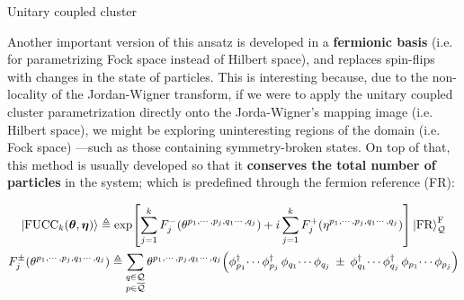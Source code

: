 \documentclass[9pt, handout, aspectratio=169]{beamer}	%
\begin{document}
\begin{frame}[allowframebreaks]{Unitary coupled cluster}
\break

	Another important version of this ansatz is developed in a \textbf{fermionic basis} (i.e. for parametrizing Fock space instead of Hilbert space), and replaces spin-flips with changes in the state of particles. This is interesting because, due to the non-locality of the Jordan-Wigner transform, if we were to apply the unitary coupled cluster parametrization directly onto the Jorda-Wigner's mapping image (i.e. Hilbert space), we might be exploring uninteresting regions of the domain (i.e. Fock space) ---such as those containing symmetry-broken states. On top of that, this method is usually developed so that it \textbf{conserves the total number of particles} in the system; which is predefined through the fermion reference (FR):

	\begin{gather*}
	  \ket{\text{FUCC}_{k} \qty(\boldsymbol{\theta},\boldsymbol{\eta})} \triangleq
	    \exp[
	      \sum_{j=1}^{k} F_{j}^{-} \qty(\theta^{p_1,\cdots,p_j,q_1\cdots,q_j}) +i
	      \sum_{j=1}^{k} F_{j}^{+} \qty(\eta^{p_1,\cdots,p_j,q_1\cdots,q_j})
	    ]
	    \ket{\text{FR}}^{\text{F}}_{\mathcal{Q}} \\
	    F_{j}^{\pm} \qty(\theta^{p_1,\cdots,p_j,q_1\cdots,q_j}) \triangleq
	      \sum_{\substack{q \in \mathcal{Q} \\ p \in \overline{\mathcal{Q}}}}
	      \theta^{p_1,\cdots,p_j,q_1\cdots,q_j} \qty(
	        \phi^{\dagger}_{p_1} \! \cdots \phi^{\dagger}_{p_j} \,
	        \phi_{q_1} \! \cdots \phi_{q_j} \: \pm \:
	        \phi^{\dagger}_{q_1} \! \cdots \phi^{\dagger}_{q_j} \,
	        \phi_{p_1} \! \cdots \phi_{p_j}
	      )
	\end{gather*}

\end{frame}

\end{document}
